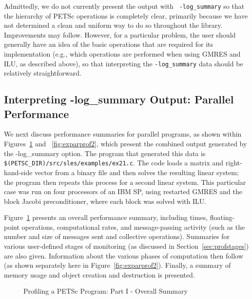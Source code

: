 Admittedly, we do not currently present the output with {\tt
-log\_summary} so that the hierarchy of PETSc operations is completely
clear, primarily because we have not determined a clean and uniform
way to do so throughout the library.  Improvements may follow.
However, for a particular problem, the user should generally have
an idea of the basic operations that are required for its
implementation (e.g., which operations are performed when using GMRES
and ILU, as described above), so that interpreting the {\tt -log\_summary}
data should be relatively straightforward.

\subsection{Interpreting -log\_summary Output: Parallel Performance}
\label{sec:parperformance}

We next discuss performance summaries for parallel programs,
 as shown within Figures~\ref{fig:exparprof} and
~\ref{fig:exparprof2}, which present the combined output generated by
the {-log\_summary} option.  The program that generated this data is
{\tt \$(PETSC\_DIR)/src/sles/examples/ex21.c}.  The code loads a
matrix and right-hand-side vector from a binary file and then solves
the resulting linear system; the program then repeats this process for
a second linear system.  This particular case was run on four
processors of an IBM SP, using restarted GMRES and the block Jacobi
preconditioner, where each block was solved with ILU.

Figure~\ref{fig:exparprof} presents an overall performance summary,
including times, floating-point operations, computational rates, and
message-passing activity (such as the number and size of messages sent
and collective operations).  Summaries for various user-defined stages
of monitoring (as discussed in Section~\ref{sec:profstages}) are also
given. Information about the various phases of computation then follow
(as shown separately here in Figure~\ref{fig:exparprof2}).
Finally, a summary of memory usage and object creation and destruction
is presented.

\begin{figure}[tb]
\centerline{}
\vspace{-2.5in}
\caption{Profiling a PETSc Program: Part I - Overall Summary}
\label{fig:exparprof}
\end{figure}

